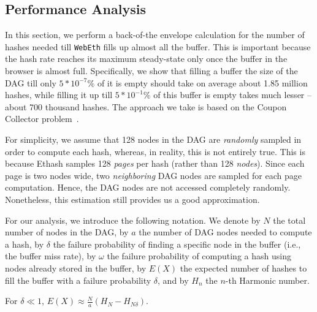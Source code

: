 \documentclass[runningheads]{llncs}
\begin{document}
\subsection{Performance Analysis}
In this section, we perform a back-of-the envelope calculation for the number of hashes needed till \verb|WebEth| fills up almost all the buffer. This is important because the hash rate reaches its maximum steady-state only once the buffer in the browser is almost full. Specifically, we show that filling a buffer the size of the DAG till only $5*10^{-7}\%$ of it is empty should take on average about 1.85 million hashes,
while filling it up till $5*10^{-1}\%$ of this buffer is empty takes much lesser -- about 700 thousand hashes.
The approach we take is based on the Coupon Collector problem~\cite{couponCollector}. 

For simplicity, we assume that 128 nodes in the DAG are \textit{randomly} sampled in order to compute each hash, whereas, in reality, this is not entirely true. This is because Ethash samples 128 \textit{pages} per hash (rather than 128 \textit{nodes}). Since each page is two nodes wide, two \textit{neighboring} DAG nodes are sampled for each page computation. Hence, the DAG nodes are not accessed completely randomly. Nonetheless, this estimation still provides us a good approximation.

For our analysis, we introduce the following notation. We denote by $N$ the total number of nodes in the DAG, by $a$ the number of DAG nodes needed to compute a hash, by $\delta$ the failure probability of finding a specific node in the buffer (i.e., the buffer miss rate), by $\omega$ the failure probability of computing a hash using nodes already stored in the buffer, by $E(X)$ the expected number of hashes to fill the buffer with a failure probability $\delta$, and by $H_n$ the $n$-th Harmonic number.
\begin{claim}
For $\delta \ll 1$, $E(X) \approx \frac{N}{a}(H_{N} -H_{N\delta}).$
\end{claim}
\end{document}
